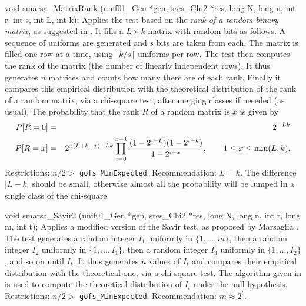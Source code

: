 void smarsa_MatrixRank (unif01_Gen *gen, sres_Chi2 *res,
                        long N, long n, int r, int s, int L, int k);
\endcode
 \tab
  Applies the test based on the {\em rank of a random binary matrix\/},
  as
  suggested in \cite {rMAR85a,rMAR85b}.
  It fills a $L\times k$  matrix with  random bits  as follows.
  A sequence of uniforms are generated and $s$ bits are taken from each.
  The matrix is filled one row at a time, using
  $\lceil k/s\rceil$ uniforms per row.
  The test then computes the rank of the matrix
  (the number of linearly independent rows).
  It thus generates $n$ matrices and counts how many
  there are of each rank.
  Finally it  compares this  empirical  distribution
  with the theoretical distribution of the rank of a random matrix,
  via a chi-square test, after merging classes if neeeded (as usual).
  The probability that the rank $R$ of a random matrix is $x$ is given by
  \begin{eqnarray*}
   P[R=0] & =& {2^{-Lk}} \\
   P[R=x] & =& 2^{x(L+k-x)-Lk} \prod_{i=0}^{x-1}
               { (1-2^{i-L})(1-2^{i-k}) \over 1-2^{i-x} },
                  \qquad 1 \le x \le \min (L, k).
  \end{eqnarray*}
  Restrictions:  $n/2 > $ {\tt gofs\_MinExpected}.  Recommendation: $L = k$.
  The difference $|L - k|$ should be small, otherwise almost all the
  probability will be lumped in a single class of the chi-square.
 \endtab
\code


void smarsa_Savir2 (unif01_Gen *gen, sres_Chi2 *res,
                    long N, long n, int r, long m, int t);
\endcode
 \tab
  Applies a modified version of the Savir test, as proposed by
  Marsaglia \cite{rMAR85c}.
  The test generates a random integer $I_1$ uniformly in $\{1,\dots,m\}$,
  then a random integer $I_2$ uniformly in $\{1,\dots,I_1\}$,
  then a random integer $I_3$ uniformly in $\{1,\dots,I_2\}$,
  and so on until $I_t$.
  It thus generates $n$ values of $I_t$ and compares their empirical
  distribution with the theoretical one, via a chi-square test.
  The algorithm given in \cite{rMAR85c} is used to compute the
  theoretical distribution of $I_t$ under the null hypothesis.
  Restrictions:   $n/2 > $ {\tt gofs\_MinExpected}.
  Recommendation: $m \approx 2^t$.
 \endtab
\code



